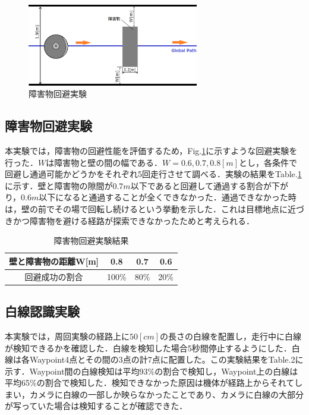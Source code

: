 \documentclass{jarticle}
\begin{document}
\begin{figure}
	\includegraphics[width=7.5cm]{./picture/obstacle_test.png}
	\caption{障害物回避実験}
	\label{fig:obstacle_test}
\end{figure}

\subsection{障害物回避実験}
本実験では，障害物の回避性能を評価するため，Fig.\ref{fig:obstacle_test}に示すような回避実験を行った．$W$は障害物と壁の間の幅である．$W=0.6,0.7,0.8[m]$とし，各条件で回避し通過可能かどうかをそれぞれ5回走行させて調べる．実験の結果をTable.\ref{table:obstacle_test}に示す．壁と障害物の隙間が$0.7m$以下であると回避して通過する割合が下がり，$0.6m$以下になると通過することが全くできなかった．通過できなかった時は，壁の前でその場で回転し続けるという挙動を示した．これは目標地点に近づきかつ障害物を避ける経路が探索できなかったためと考えられる．
\begin{table}[h]
\caption{障害物回避実験結果}
\label{table:obstacle_test}
\begin{tabular}{|c|c|c|c|}
	\hline
	壁と障害物の距離W{[}m{]} & 0.8   & 0.7  & 0.6  \\
	\hline
	回避成功の割合          & 100\% & 80\% & 20\% \\
	\hline
\end{tabular}
\end{table}

\subsection{白線認識実験}
本実験では，周回実験の経路上に$50[cm]$の長さの白線を配置し，走行中に白線が検知できるかを確認した．白線を検知した場合5秒間停止するようにした．白線は各Waypoint4点とその間の3点の計7点に配置した。この実験結果をTable.2に示す．Waypoint間の白線検知は平均93\%の割合で検知し，Waypoint上の白線は平均65\%の割合で検知した．検知できなかった原因は機体が経路上からそれてしまい，カメラに白線の一部しか映らなかったことであり、カメラに白線の大部分が写っていた場合は検知することが確認できた．
\end{document}
